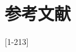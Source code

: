 \documentclass[11pt]{article}
\begin{document}
\section*{\kaishu  参考文献}

[1-213]

%
%


%



%



%






\end{document}

